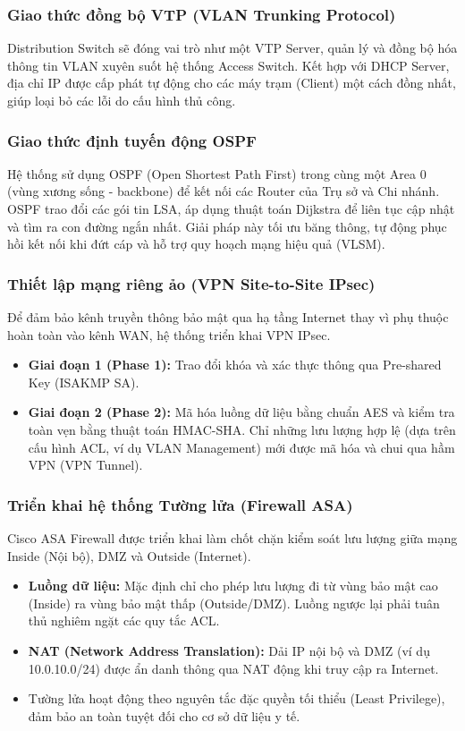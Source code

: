 \subsubsection{Giao thức đồng bộ VTP (VLAN Trunking Protocol)}
Distribution Switch sẽ đóng vai trò như một VTP Server, quản lý và đồng bộ hóa thông tin VLAN xuyên suốt hệ thống Access Switch. Kết hợp với DHCP Server, địa chỉ IP được cấp phát tự động cho các máy trạm (Client) một cách đồng nhất, giúp loại bỏ các lỗi do cấu hình thủ công.

\subsubsection{Giao thức định tuyến động OSPF}
Hệ thống sử dụng OSPF (Open Shortest Path First) trong cùng một Area 0 (vùng xương sống - backbone) để kết nối các Router của Trụ sở và Chi nhánh. OSPF trao đổi các gói tin LSA, áp dụng thuật toán Dijkstra để liên tục cập nhật và tìm ra con đường ngắn nhất. Giải pháp này tối ưu băng thông, tự động phục hồi kết nối khi đứt cáp và hỗ trợ quy hoạch mạng hiệu quả (VLSM).

\subsubsection{Thiết lập mạng riêng ảo (VPN Site-to-Site IPsec)}
Để đảm bảo kênh truyền thông bảo mật qua hạ tầng Internet thay vì phụ thuộc hoàn toàn vào kênh WAN, hệ thống triển khai VPN IPsec.
\begin{itemize}
    \item \textbf{Giai đoạn 1 (Phase 1):} Trao đổi khóa và xác thực thông qua Pre-shared Key (ISAKMP SA).
    \item \textbf{Giai đoạn 2 (Phase 2):} Mã hóa luồng dữ liệu bằng chuẩn AES và kiểm tra toàn vẹn bằng thuật toán HMAC-SHA. Chỉ những lưu lượng hợp lệ (dựa trên cấu hình ACL, ví dụ VLAN Management) mới được mã hóa và chui qua hầm VPN (VPN Tunnel).
\end{itemize}

\subsubsection{Triển khai hệ thống Tường lửa (Firewall ASA)}
Cisco ASA Firewall được triển khai làm chốt chặn kiểm soát lưu lượng giữa mạng Inside (Nội bộ), DMZ và Outside (Internet). 
\begin{itemize}
    \item \textbf{Luồng dữ liệu:} Mặc định chỉ cho phép lưu lượng đi từ vùng bảo mật cao (Inside) ra vùng bảo mật thấp (Outside/DMZ). Luồng ngược lại phải tuân thủ nghiêm ngặt các quy tắc ACL.
    \item \textbf{NAT (Network Address Translation):} Dải IP nội bộ và DMZ (ví dụ 10.0.10.0/24) được ẩn danh thông qua NAT động khi truy cập ra Internet.
    \item Tường lửa hoạt động theo nguyên tắc đặc quyền tối thiểu (Least Privilege), đảm bảo an toàn tuyệt đối cho cơ sở dữ liệu y tế.
\end{itemize}
